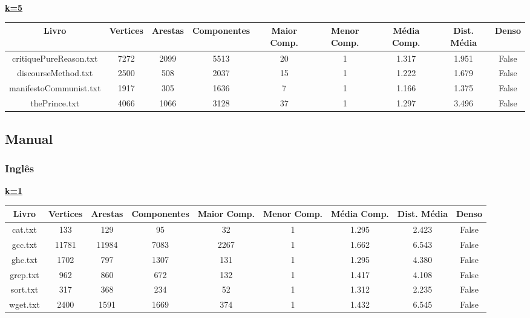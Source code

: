 \documentclass[12pt]{article}
\newcommand{\mytitle}[1]{\textbf{\underline{#1}}}
\begin{document}
\noindent\mytitle{k=5}
\begin{center}
\begin{tabular}{||c | c | c | c | c | c | c | c | c||}
\hline
Livro & Vertices & Arestas & Componentes & Maior Comp. & Menor Comp. & Média Comp. & Dist. Média & Denso \\ [0.5ex]
\hline\hline
critiquePureReason.txt & 7272 & 2099 & 5513 & 20 & 1 & 1.317 & 1.951 & False \\
\hline
discourseMethod.txt & 2500 & 508 & 2037 & 15 & 1 & 1.222 & 1.679 & False \\
\hline
manifestoCommunist.txt & 1917 & 305 & 1636 & 7 & 1 & 1.166 & 1.375 & False \\
\hline
thePrince.txt & 4066 & 1066 & 3128 & 37 & 1 & 1.297 & 3.496 & False \\
\hline
\end{tabular}
\end{center}


\subsection{Manual}

\subsubsection{Inglês}

\noindent\mytitle{k=1}
\begin{center}
\begin{tabular}{||c | c | c | c | c | c | c | c | c||}
\hline
Livro & Vertices & Arestas & Componentes & Maior Comp. & Menor Comp. & Média Comp. & Dist. Média & Denso \\ [0.5ex]
\hline\hline
cat.txt & 133 & 129 & 95 & 32 & 1 & 1.295 & 2.423 & False \\
\hline
gcc.txt & 11781 & 11984 & 7083 & 2267 & 1 & 1.662 & 6.543 & False \\
\hline
ghc.txt & 1702 & 797 & 1307 & 131 & 1 & 1.295 & 4.380 & False \\
\hline
grep.txt & 962 & 860 & 672 & 132 & 1 & 1.417 & 4.108 & False \\
\hline
sort.txt & 317 & 368 & 234 & 52 & 1 & 1.312 & 2.235 & False \\
\hline
wget.txt & 2400 & 1591 & 1669 & 374 & 1 & 1.432 & 6.545 & False \\
\hline
\end{tabular}
\end{center}
\end{document}
